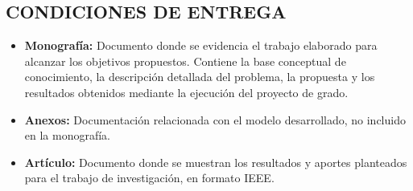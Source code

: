 \newpage
\begin{center}
\section{CONDICIONES DE ENTREGA}
\end{center}

\begin{itemize}
    \item \textbf{Monografía:} Documento donde se evidencia el trabajo elaborado para alcanzar los objetivos propuestos. Contiene la base conceptual de conocimiento, la descripción detallada del problema, la propuesta y los resultados obtenidos mediante la ejecución del proyecto de grado.
    \item \textbf{Anexos:} Documentación relacionada con el modelo desarrollado, no incluido en la monografía.
    \item \textbf{Artículo:} Documento donde se muestran los resultados y aportes planteados para el trabajo de investigación, en formato IEEE.
\end{itemize}
\vspace{0.5cm}